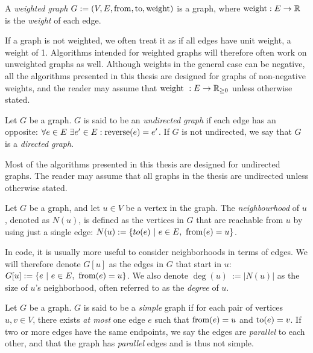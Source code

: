 \begin{definition}
    A \emph{weighted graph} $G := (V, E, \operatorname{from}, \operatorname{to}, \operatorname{weight})$ is a graph, where $\operatorname{weight} : E \rightarrow \mathbb{R}$ is the \emph{weight} of each edge. 
\end{definition}

If a graph is not weighted, we often treat it as if all edges have unit weight, a weight of 1. Algorithms intended for weighted graphs will therefore often work on unweighted graphs as well. Although weights in the general case can be negative, all the algorithms presented in this thesis are designed for graphs of non-negative weights, and the reader may assume that $\operatorname{weight}~: E \rightarrow \mathbb{R}_{\geq0}$ unless otherwise stated.

\begin{definition}
    Let $G$ be a graph. $G$ is said to be an \emph{undirected graph} if each edge has an opposite: $\forall e \in E ~ \exists e' \in E : \operatorname{reverse}(e) = e'$.
    If $G$ is not undirected, we say that $G$ is a \emph{directed graph}.
\end{definition}
Most of the algorithms presented in this thesis are designed for undirected graphs. The reader may assume that all graphs in the thesis are undirected unless otherwise stated.

\begin{definition}[Neighbourhood]
    Let $G$ be a graph, and let $u \in V$ be a vertex in the graph. The \emph{neighbourhood} of $u$, denoted as $N(u)$, is defined as the vertices in $G$ that are reachable from $u$ by using just a single edge: $N(u) := \{ to(e)  ~|~  e \in E, ~ \operatorname{from}(e) = u\}$. 
\end{definition}
In code, it is usually more useful to consider neighborhoods in terms of edges. We will therefore denote $G[u]$ as the edges in $G$ that start in $u$: $G[u] := \{e ~ | ~ e \in E, ~ \operatorname{from}(e) = u\}$. We also denote $\deg(u)~:= |N(u)|$ as the size of $u$'s neighborhood, often referred to as the \emph{degree} of $u$.

\begin{definition}
    Let $G$ be a graph. $G$ is said to be a \emph{simple} graph if for each pair of vertices $u,v \in V$, there exists \emph{at most} one edge $e$ such that $\operatorname{from}(e) = u$ and $\operatorname{to}(e) = v$. If two or more edges have the same endpoints, we say the edges are \emph{parallel} to each other, and that the graph has \emph{parallel} edges and is thus not simple.
\end{definition}

